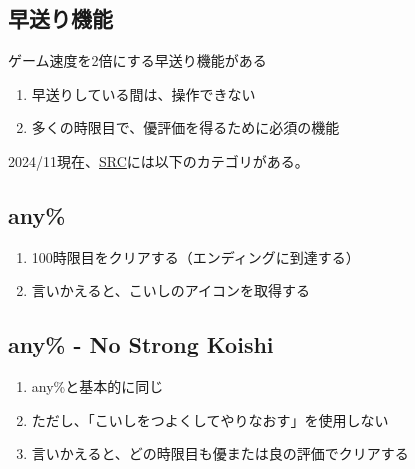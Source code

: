 \subsection{早送り機能}
ゲーム速度を2倍にする早送り機能がある
\begin{enumerate}[label={\sarrow}]
\item 早送りしている間は、操作できない
\item 多くの時限目で、優評価を得るために必須の機能
\end{enumerate}







2024/11現在、\href{https://www.speedrun.com/komeiji_satori_no_jousou_kyouiku}{SRC}には以下のカテゴリがある。


\subsection{any\%}
\begin{enumerate}[label={\sarrow}]
\item 100時限目をクリアする（エンディングに到達する）
\item 言いかえると、こいしのアイコンを取得する
\end{enumerate}


\subsection{any\% - No Strong Koishi}
\begin{enumerate}[label={\sarrow}]
\item any\%と基本的に同じ
\item ただし、「こいしをつよくしてやりなおす」を使用しない
\item 言いかえると、どの時限目も優または良の評価でクリアする
\end{enumerate}


